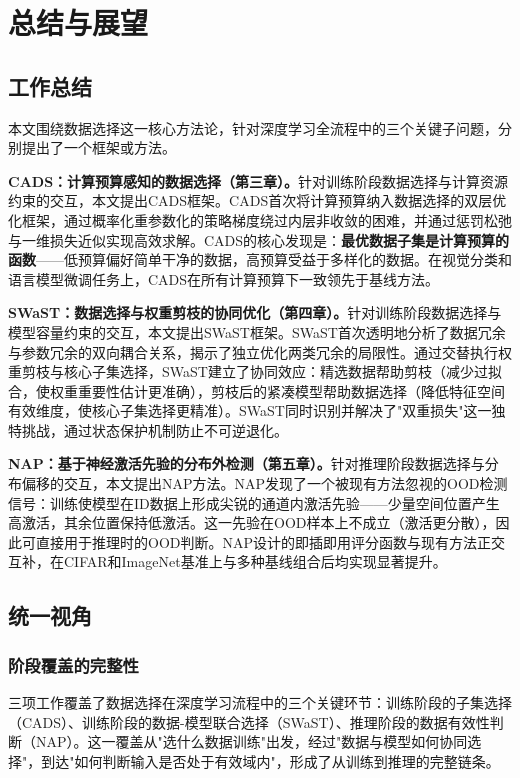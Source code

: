 \chapter{总结与展望}

\section{工作总结}

本文围绕数据选择这一核心方法论，针对深度学习全流程中的三个关键子问题，分别提出了一个框架或方法。

\textbf{CADS：计算预算感知的数据选择（第三章）。}针对训练阶段数据选择与计算资源约束的交互，本文提出CADS框架。CADS首次将计算预算纳入数据选择的双层优化框架，通过概率化重参数化的策略梯度绕过内层非收敛的困难，并通过惩罚松弛与一维损失近似实现高效求解。CADS的核心发现是：\textbf{最优数据子集是计算预算的函数}——低预算偏好简单干净的数据，高预算受益于多样化的数据。在视觉分类和语言模型微调任务上，CADS在所有计算预算下一致领先于基线方法。

\textbf{SWaST：数据选择与权重剪枝的协同优化（第四章）。}针对训练阶段数据选择与模型容量约束的交互，本文提出SWaST框架。SWaST首次透明地分析了数据冗余与参数冗余的双向耦合关系，揭示了独立优化两类冗余的局限性。通过交替执行权重剪枝与核心子集选择，SWaST建立了协同效应：精选数据帮助剪枝（减少过拟合，使权重重要性估计更准确），剪枝后的紧凑模型帮助数据选择（降低特征空间有效维度，使核心子集选择更精准）。SWaST同时识别并解决了"双重损失"这一独特挑战，通过状态保护机制防止不可逆退化。

\textbf{NAP：基于神经激活先验的分布外检测（第五章）。}针对推理阶段数据选择与分布偏移的交互，本文提出NAP方法。NAP发现了一个被现有方法忽视的OOD检测信号：训练使模型在ID数据上形成尖锐的通道内激活先验——少量空间位置产生高激活，其余位置保持低激活。这一先验在OOD样本上不成立（激活更分散），因此可直接用于推理时的OOD判断。NAP设计的即插即用评分函数与现有方法正交互补，在CIFAR和ImageNet基准上与多种基线组合后均实现显著提升。


\section{统一视角}

\subsection{阶段覆盖的完整性}

三项工作覆盖了数据选择在深度学习流程中的三个关键环节：训练阶段的子集选择（CADS）、训练阶段的数据-模型联合选择（SWaST）、推理阶段的数据有效性判断（NAP）。这一覆盖从"选什么数据训练"出发，经过"数据与模型如何协同选择"，到达"如何判断输入是否处于有效域内"，形成了从训练到推理的完整链条。

